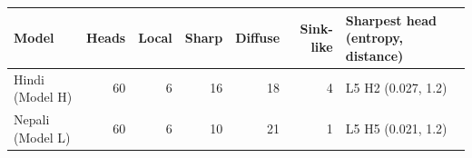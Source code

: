 \begin{tabular}{lrrrrrl}
\toprule
Model & Heads & Local & Sharp & Diffuse & Sink-like & Sharpest head (entropy, distance) \\
\midrule
Hindi (Model H) & 60 & 6 & 16 & 18 & 4 & L5 H2 (0.027, 1.2) \\
Nepali (Model L) & 60 & 6 & 10 & 21 & 1 & L5 H5 (0.021, 1.2) \\
\bottomrule
\end{tabular}
